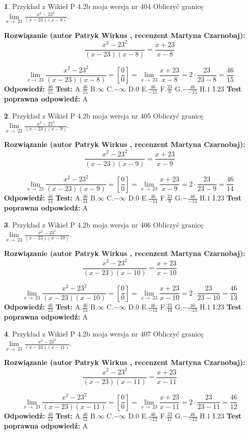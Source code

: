 \documentclass[12pt, a4paper]{article}
\theoremstyle{definition} %
\newtheorem{zad}{}
\newcommand{\zadStart}[1]{\begin{zad}#1\newline}
\newcommand{\zadStop}{\end{zad}}
\newcommand{\rozwStart}[2]{\noindent \textbf{Rozwiązanie (autor #1 , recenzent #2): }\newline}
\newcommand{\rozwStop}{\newline}
\newcommand{\odpStart}{\noindent \textbf{Odpowiedź:}\newline}
\newcommand{\odpStop}{\newline}
\newcommand{\testStart}{\noindent \textbf{Test:}\newline}
\newcommand{\testStop}{\newline}
\newcommand{\kluczStart}{\noindent \textbf{Test poprawna odpowiedź:}\newline}
\newcommand{\kluczStop}{\newline}
\begin{document}
\zadStart{Przykład z Wikieł P 4.2b moja wersja nr 404}
Obliczyć granicę $\lim\limits_{x\to\ 23}\frac{x^{2}-23^{2}}{(x-23)(x-8)}$.
\zadStop
\rozwStart{Patryk Wirkus}{Martyna Czarnobaj}
$$\frac{x^{2}-23^{2}}{(x-23)(x-8)}=\frac{x+23}{x-8}$$

$$\lim\limits_{x\to\ 23}\frac{x^{2}-23^{2}}{(x-23)(x-8)}=[\frac{0}{0}]=\lim\limits_{x\to\ 23}\frac{x+23}{x-8}=2 \cdot \frac{23}{23-8} = \frac{46}{15}$$
\rozwStop
\odpStart
$\frac{46}{15}$
\odpStop
\testStart
A.$\frac{46}{15}$
B.$\infty$
C.$-\infty$
D.$0$
E.$\frac{46}{-15}$
F.$\frac{23}{8}$
G.$-\frac{46}{-15}$
H.$1$
I.$23$
\testStop
\kluczStart
A
\kluczStop



\zadStart{Przykład z Wikieł P 4.2b moja wersja nr 405}
Obliczyć granicę $\lim\limits_{x\to\ 23}\frac{x^{2}-23^{2}}{(x-23)(x-9)}$.
\zadStop
\rozwStart{Patryk Wirkus}{Martyna Czarnobaj}
$$\frac{x^{2}-23^{2}}{(x-23)(x-9)}=\frac{x+23}{x-9}$$

$$\lim\limits_{x\to\ 23}\frac{x^{2}-23^{2}}{(x-23)(x-9)}=[\frac{0}{0}]=\lim\limits_{x\to\ 23}\frac{x+23}{x-9}=2 \cdot \frac{23}{23-9} = \frac{46}{14}$$
\rozwStop
\odpStart
$\frac{46}{14}$
\odpStop
\testStart
A.$\frac{46}{14}$
B.$\infty$
C.$-\infty$
D.$0$
E.$\frac{46}{-14}$
F.$\frac{23}{9}$
G.$-\frac{46}{-14}$
H.$1$
I.$23$
\testStop
\kluczStart
A
\kluczStop



\zadStart{Przykład z Wikieł P 4.2b moja wersja nr 406}
Obliczyć granicę $\lim\limits_{x\to\ 23}\frac{x^{2}-23^{2}}{(x-23)(x-10)}$.
\zadStop
\rozwStart{Patryk Wirkus}{Martyna Czarnobaj}
$$\frac{x^{2}-23^{2}}{(x-23)(x-10)}=\frac{x+23}{x-10}$$

$$\lim\limits_{x\to\ 23}\frac{x^{2}-23^{2}}{(x-23)(x-10)}=[\frac{0}{0}]=\lim\limits_{x\to\ 23}\frac{x+23}{x-10}=2 \cdot \frac{23}{23-10} = \frac{46}{13}$$
\rozwStop
\odpStart
$\frac{46}{13}$
\odpStop
\testStart
A.$\frac{46}{13}$
B.$\infty$
C.$-\infty$
D.$0$
E.$\frac{46}{-13}$
F.$\frac{23}{10}$
G.$-\frac{46}{-13}$
H.$1$
I.$23$
\testStop
\kluczStart
A
\kluczStop



\zadStart{Przykład z Wikieł P 4.2b moja wersja nr 407}
Obliczyć granicę $\lim\limits_{x\to\ 23}\frac{x^{2}-23^{2}}{(x-23)(x-11)}$.
\zadStop
\rozwStart{Patryk Wirkus}{Martyna Czarnobaj}
$$\frac{x^{2}-23^{2}}{(x-23)(x-11)}=\frac{x+23}{x-11}$$

$$\lim\limits_{x\to\ 23}\frac{x^{2}-23^{2}}{(x-23)(x-11)}=[\frac{0}{0}]=\lim\limits_{x\to\ 23}\frac{x+23}{x-11}=2 \cdot \frac{23}{23-11} = \frac{46}{12}$$
\rozwStop
\odpStart
$\frac{46}{12}$
\odpStop
\testStart
A.$\frac{46}{12}$
B.$\infty$
C.$-\infty$
D.$0$
E.$\frac{46}{-12}$
F.$\frac{23}{11}$
G.$-\frac{46}{-12}$
H.$1$
I.$23$
\testStop
\kluczStart
A
\kluczStop
\end{document}
